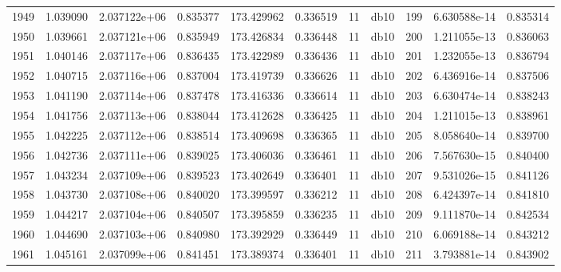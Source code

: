 \begin{tabular}{lrrrrrrlrrr}
1949 &    1.039090 &        2.037122e+06 &  0.835377 &              173.429962 &    0.336519 &      11 &         db10 &    199 &   6.630588e-14 &      0.835314 \\
1950 &    1.039661 &        2.037121e+06 &  0.835949 &              173.426834 &    0.336448 &      11 &         db10 &    200 &   1.211055e-13 &      0.836063 \\
1951 &    1.040146 &        2.037117e+06 &  0.836435 &              173.422989 &    0.336436 &      11 &         db10 &    201 &   1.232055e-13 &      0.836794 \\
1952 &    1.040715 &        2.037116e+06 &  0.837004 &              173.419739 &    0.336626 &      11 &         db10 &    202 &   6.436916e-14 &      0.837506 \\
1953 &    1.041190 &        2.037114e+06 &  0.837478 &              173.416336 &    0.336614 &      11 &         db10 &    203 &   6.630474e-14 &      0.838243 \\
1954 &    1.041756 &        2.037113e+06 &  0.838044 &              173.412628 &    0.336425 &      11 &         db10 &    204 &   1.211015e-13 &      0.838961 \\
1955 &    1.042225 &        2.037112e+06 &  0.838514 &              173.409698 &    0.336365 &      11 &         db10 &    205 &   8.058640e-14 &      0.839700 \\
1956 &    1.042736 &        2.037111e+06 &  0.839025 &              173.406036 &    0.336461 &      11 &         db10 &    206 &   7.567630e-15 &      0.840400 \\
1957 &    1.043234 &        2.037109e+06 &  0.839523 &              173.402649 &    0.336401 &      11 &         db10 &    207 &   9.531026e-15 &      0.841126 \\
1958 &    1.043730 &        2.037108e+06 &  0.840020 &              173.399597 &    0.336212 &      11 &         db10 &    208 &   6.424397e-14 &      0.841810 \\
1959 &    1.044217 &        2.037104e+06 &  0.840507 &              173.395859 &    0.336235 &      11 &         db10 &    209 &   9.111870e-14 &      0.842534 \\
1960 &    1.044690 &        2.037103e+06 &  0.840980 &              173.392929 &    0.336449 &      11 &         db10 &    210 &   6.069188e-14 &      0.843212 \\
1961 &    1.045161 &        2.037099e+06 &  0.841451 &              173.389374 &    0.336401 &      11 &         db10 &    211 &   3.793881e-14 &      0.843902 \\

\end{tabular}
